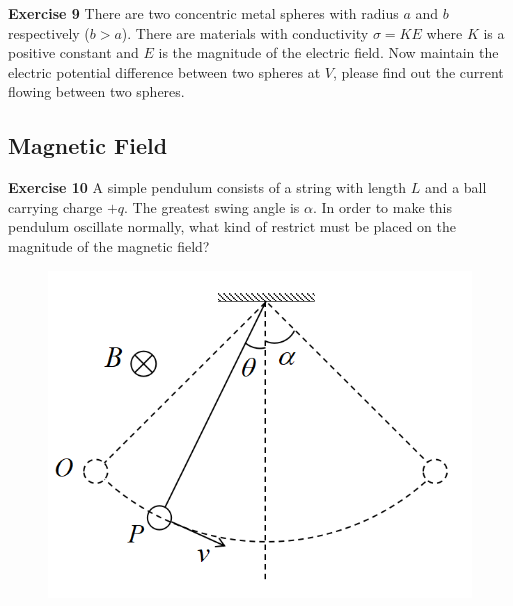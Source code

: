 \documentclass{beamer}
\begin{document}
\begin{frame}{\bf Exercise 9}
    There are two concentric metal spheres with radius $a$ 
    and $b$ respectively ($b>a$). There are materials with 
    conductivity $\sigma=KE$ where $K$ is a positive constant 
    and $E$ is the magnitude of the electric field. Now 
    maintain the electric potential difference between 
    two spheres at $V$, please find out the current flowing 
    between two spheres.
\end{frame}


\subsection{\bf Magnetic Field}

\begin{frame}{\bf Exercise 10}
    A simple pendulum consists of a string with length $L$ 
    and a ball carrying charge $+q$. The greatest swing angle is $\alpha$. 
    In order to make this pendulum oscillate normally, what kind of restrict 
    must be placed on the magnitude of the magnetic field?

    \begin{figure}
        \centering
        \includegraphics[scale=0.6]{images/005.png}
    \end{figure}
\end{frame}
\end{document}
